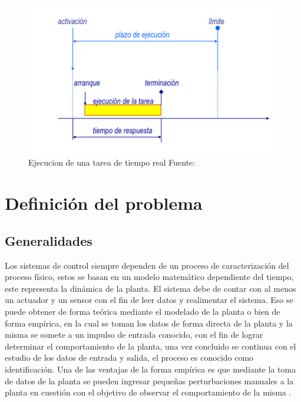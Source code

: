 \documentclass[12pt]{article}
\begin{document}
\begin{figure}[h!]
  \centering
  \includegraphics[scale=0.5]{diagramas/tiempo_real.png}
  \caption{Ejecucion de una tarea de tiempo real Fuente: \cite{de2000introduccion}}
  \label{fig:diagrama_tiempo_real}
\end{figure}

\newpage

\section{Definición del problema}

\subsection{Generalidades}

Los sistemas de control siempre dependen de un proceso de caracterización del proceso físico, estos se basan en un modelo matemático dependiente del tiempo, este representa la dinámica de la planta. El sistema debe de contar con al menos un actuador y un sensor con el fin de leer datos y realimentar el sistema. Eso se puede obtener de forma teórica mediante el modelado de la planta o bien de forma empírica, en la cual se toman los datos de forma directa de la planta y la misma se somete a un impulso de entrada conocido, con el fin de lograr determinar el comportamiento de la planta, una vez concluido se continua con el estudio de los datos de entrada y salida, el proceso es conocido como identificación. Una de las ventajas de la forma empírica es que mediante la toma de datos de la planta se pueden ingresar pequeñas perturbaciones manuales a la planta en cuestión con el objetivo de observar el comportamiento de la misma \cite{15-tec}. 
\end{document}
